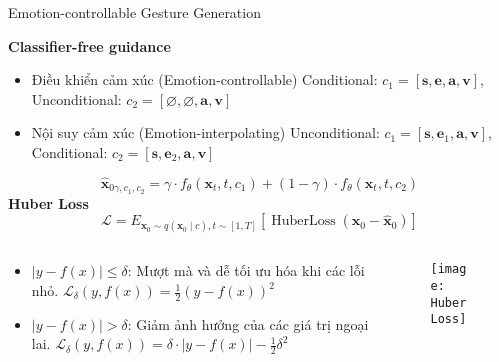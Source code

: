 
\begin{frame}{Emotion-controllable Gesture Generation}
	
	\textbf{Classifier-free guidance}
	
	\begin{itemize}
		\item Điều khiển cảm xúc (Emotion-controllable)
		Conditional: $c_1 = [ \mathbf{s}, \mathbf{e}, \mathbf{a} , \mathbf{v}]$,  Unconditional: $c_2 = [ \varnothing, \varnothing, \mathbf{a}, \mathbf{v} ]$
		
		\item Nội suy cảm xúc (Emotion-interpolating)
		Unconditional: $c_1 = [ \mathbf{s}, \mathbf{e}_1, \mathbf{a} , \mathbf{v}]$, Conditional: $c_2 = [ \mathbf{s}, \mathbf{e}_2, \mathbf{a}, \mathbf{v} ]$
	\end{itemize}
	\begin{equation} \label{eq:denoise}
		\hat{\mathbf{x}}_{0 \gamma, c_{1}, c_{2}}=\gamma \cdot f_{\theta} \left(\mathbf{x}_{t}, t, c_{1}\right)+(1-\gamma) \cdot f_{\theta} \left(\mathbf{x}_{t}, t, c_{2}\right)
	\end{equation}
	\vspace{-5pt}
	\textbf{Huber Loss}
	\begin{equation} \label{eq:huberloss}
		\mathcal{L}=E_{\mathbf{x}_{0} \sim q\left(\mathbf{x}_{0} \mid c\right), t \sim[1, T]}\left[\operatorname{HuberLoss}\left(\mathbf{x}_{0}-\hat{\mathbf{x}}_{0}\right)\right]
	\end{equation}
	\vspace{-5pt}
	\begin{columns}
		\begin{column}{0.5\textwidth}
			\begin{itemize}
				\item $ |y - f(x)| \leq \delta$:
				Mượt mà và dễ tối ưu hóa khi các lỗi nhỏ.
					$\mathcal{L}_{\delta}(y, f(x)) = \frac{1}{2} (y - f(x))^2$
				\item $ |y - f(x)| > \delta$: 
				Giảm ảnh hưởng của các giá trị ngoại lai.
					$\mathcal{L}_{\delta}(y, f(x)) =  \delta \cdot |y - f(x)| - \frac{1}{2} \delta^2$
			\end{itemize}
		\end{column}
		\begin{column}{0.5\textwidth}
			\begin{figure}
				\centering
				\texttt{[image: HuberLoss]}
			\end{figure}
		\end{column}
	\end{columns}
	
\end{frame}




